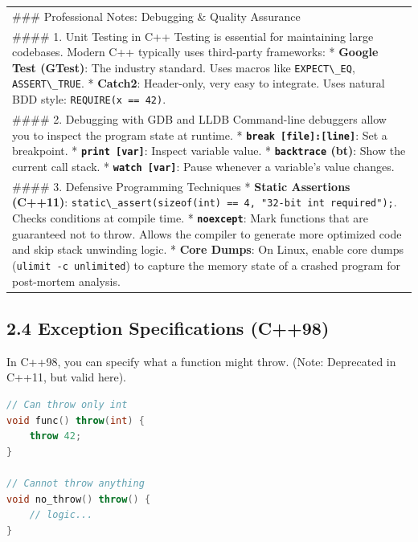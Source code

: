 \begin{longtable}[]{@{}
  >{\raggedright\arraybackslash}p{}@{}}
\toprule
\endhead
\#\#\# Professional Notes: Debugging \& Quality Assurance \\
\#\#\#\# 1. Unit Testing in C++ Testing is essential for maintaining
large codebases. Modern C++ typically uses third-party frameworks: *
\textbf{Google Test (GTest)}: The industry standard. Uses macros like
\passthrough{\lstinline!EXPECT\_EQ!},
\passthrough{\lstinline!ASSERT\_TRUE!}. * \textbf{Catch2}: Header-only,
very easy to integrate. Uses natural BDD style:
\passthrough{\lstinline!REQUIRE(x == 42)!}. \\
\#\#\#\# 2. Debugging with GDB and LLDB Command-line debuggers allow you
to inspect the program state at runtime. *
\textbf{\passthrough{\lstinline!break [file]:[line]!}}: Set a
breakpoint. * \textbf{\passthrough{\lstinline!print [var]!}}: Inspect
variable value. * \textbf{\passthrough{\lstinline!backtrace!} (bt)}:
Show the current call stack. *
\textbf{\passthrough{\lstinline!watch [var]!}}: Pause whenever a
variable's value changes. \\
\#\#\#\# 3. Defensive Programming Techniques * \textbf{Static Assertions
(C++11)}:
\passthrough{\lstinline!static\_assert(sizeof(int) == 4, "32-bit int required");!}.
Checks conditions at compile time. *
\textbf{\passthrough{\lstinline!noexcept!}}: Mark functions that are
guaranteed not to throw. Allows the compiler to generate more optimized
code and skip stack unwinding logic. * \textbf{Core Dumps}: On Linux,
enable core dumps (\passthrough{\lstinline!ulimit -c unlimited!}) to
capture the memory state of a crashed program for post-mortem
analysis. \\
\bottomrule
\end{longtable}

\hypertarget{exception-specifications-c98}{%
\subsection{2.4 Exception Specifications
(C++98)}\label{exception-specifications-c98}}

In C++98, you can specify what a function might throw. (Note: Deprecated
in C++11, but valid here).

\begin{lstlisting}[language={C++}]
// Can throw only int
void func() throw(int) {
    throw 42;
}

// Cannot throw anything
void no_throw() throw() {
    // logic...
}
\end{lstlisting}

